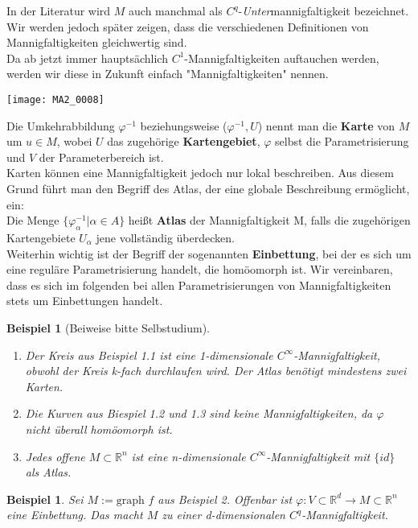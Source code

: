 \documentclass[a4paper,12pt,portrait]{book}
\newcommand{\graph}{\text{graph\ }}
\theoremstyle{theoremstyle}
\newtheorem{beispiel}[theo]{Beispiel}
\begin{document}
In der Literatur wird $M$ auch manchmal als $C^q$-\emph{Unter}mannigfaltigkeit bezeichnet. Wir werden jedoch später zeigen, dass die verschiedenen Definitionen von Mannigfaltigkeiten gleichwertig sind.\\
Da ab jetzt immer hauptsächlich $C^1$-Mannigfaltigkeiten auftauchen werden, werden wir diese in Zukunft einfach "Mannigfaltigkeiten" nennen.\\
\begin{center}
\texttt{[image: MA2\_0008]}\\
\end{center}
Die Umkehrabbildung $\varphi^{-1}$ beziehungsweise ($\varphi^{-1}, U$) nennt man die \textbf{Karte} von $M$ um $u\in M$, wobei $U$ das zugehörige \textbf{Kartengebiet}, $\varphi$ selbst die Parametrisierung und $V$ der Parameterbereich ist.\\
Karten können eine Mannigfaltigkeit jedoch nur lokal beschreiben. Aus diesem Grund führt man den Begriff des Atlas, der eine globale Beschreibung ermöglicht, ein:\\
Die Menge $\{\varphi^{-1}_\alpha | \alpha\in A\}$ heißt \textbf{Atlas} der Mannigfaltigkeit M, falls die zugehörigen Kartengebiete $U_\alpha$ jene vollständig überdecken.\\
\linebreak
Weiterhin wichtig ist der Begriff der sogenannten \textbf{Einbettung}, bei der es sich um eine reguläre Parametrisierung handelt, die homöomorph ist. Wir vereinbaren, dass es sich im folgenden bei allen Parametrisierungen von Mannigfaltigkeiten stets um Einbettungen handelt.
\begin{beispiel}[Beiweise bitte Selbstudium]\ \\
\begin{enumerate}
\item Der Kreis aus Beispiel 1.1 ist eine 1-dimensionale $C^\infty$-Mannigfaltigkeit, obwohl der Kreis k-fach durchlaufen wird. Der Atlas benötigt mindestens zwei Karten.
\item Die Kurven aus Biespiel 1.2 und 1.3 sind keine Mannigfaltigkeiten, da $\varphi$ nicht überall homöomorph ist.
\item Jedes offene $M\subset\mathbb{R}^n$ ist eine n-dimensionale $C^\infty$-Mannigfaltigkeit mit $\{id\}$ als Atlas.
\end{enumerate}
\end{beispiel}
\begin{beispiel} Sei $M:=\graph f$ aus Beispiel 2. Offenbar ist $\varphi:V\subset\mathbb{R}^d\rightarrow M\subset\mathbb{R}^n$ eine Einbettung. Das macht $M$ zu einer d-dimensionalen $C^q$-Mannigfaltigkeit.\end{beispiel}
\end{document}
